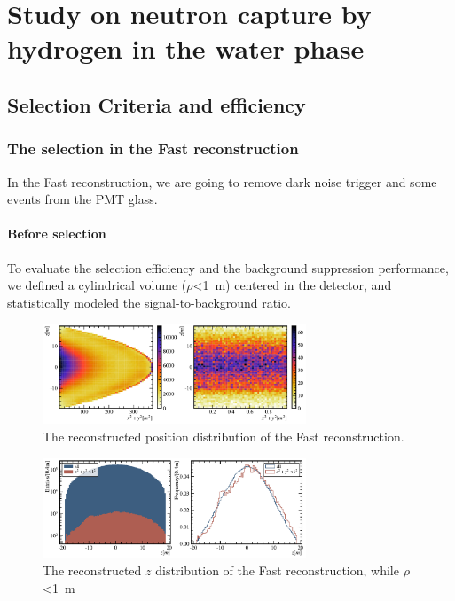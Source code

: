 \section{Study on neutron capture by hydrogen in the water phase}
\subsection{Selection Criteria and efficiency}
\subsubsection{The selection in the Fast reconstruction}
In the Fast reconstruction, we are going to remove dark noise trigger and some events from the PMT glass.

\paragraph{Before selection}
To evaluate the selection efficiency and the background suppression performance, we defined a cylindrical volume ($\rho$<\SI{1}{m}) centered in the detector, and statistically modeled the signal-to-background ratio.

\begin{figure}[!htbp]
	\centering
	\includegraphics[width=0.7\textwidth]{neutrontag/fastrecon/3671.pdf}
	\caption{The reconstructed position distribution of the Fast reconstruction.}
	\label{fast:all}
\end{figure}

\begin{figure}[!htbp]
	\centering
	\includegraphics[width=0.7\textwidth]{neutrontag/fastrecon/3671_z.pdf}
	\caption{The reconstructed $z$ distribution of the Fast reconstruction, while $\rho$<\SI{1}{m}}
	\label{fast:z}
\end{figure}


